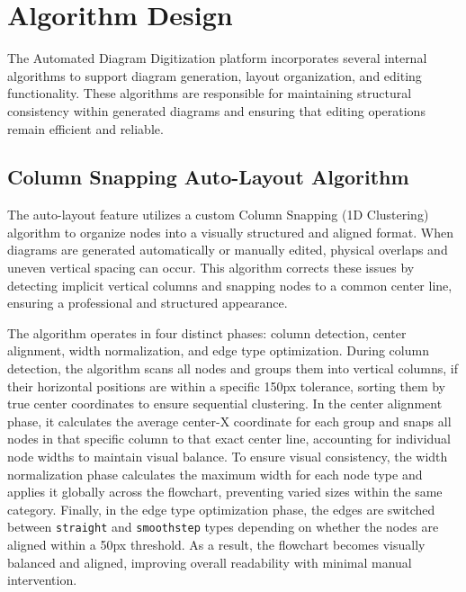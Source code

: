 
\section{Algorithm Design}
\label{sec:algorithm}

\justifying
The Automated Diagram Digitization platform incorporates several internal algorithms to support diagram generation, layout organization, and editing functionality. These algorithms are responsible for maintaining structural consistency within generated diagrams and ensuring that editing operations remain efficient and reliable.

\subsection{Column Snapping Auto-Layout Algorithm}

\justifying
The auto-layout feature utilizes a custom Column Snapping (1D Clustering) algorithm to organize nodes into a visually structured and aligned format. When diagrams are generated automatically or manually edited, physical overlaps and uneven vertical spacing can occur. This algorithm corrects these issues by detecting implicit vertical columns and snapping nodes to a common center line, ensuring a professional and structured appearance.

\justifying
The algorithm operates in four distinct phases: column detection, center alignment, width normalization, and edge type optimization. During column detection, the algorithm scans all nodes and groups them into vertical columns, if their horizontal positions are within a specific 150px tolerance, sorting them by true center coordinates to ensure sequential clustering. In the center alignment phase, it calculates the average center-X coordinate for each group and snaps all nodes in that specific column to that exact center line, accounting for individual node widths to maintain visual balance. To ensure visual consistency, the width normalization phase calculates the maximum width for each node type and applies it globally across the flowchart, preventing varied sizes within the same category. Finally, in the edge type optimization phase, the edges are switched between \texttt{straight} and \texttt{smoothstep} types depending on whether the nodes are aligned within a 50px threshold.
As a result, the flowchart becomes visually balanced and aligned, improving overall readability with minimal manual intervention.

